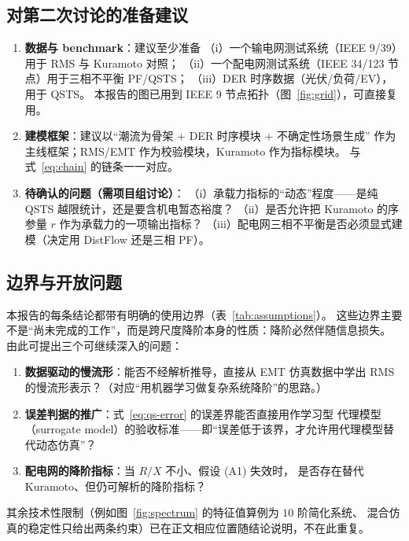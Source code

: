 \subsection{对第二次讨论的准备建议}

\begin{enumerate}[leftmargin=1.6em]
\item \textbf{数据与 benchmark}：建议至少准备
（i）一个输电网测试系统（IEEE 9/39）用于 RMS 与 Kuramoto 对照；
（ii）一个配电网测试系统（IEEE 34/123 节点）用于三相不平衡 PF/QSTS；
（iii）DER 时序数据（光伏/负荷/EV），用于 QSTS。
本报告的图已用到 IEEE 9 节点拓扑（图~\ref{fig:grid}），可直接复用。
\item \textbf{建模框架}：建议以“潮流为骨架 $+$ DER 时序模块 $+$ 不确定性场景生成”
作为主线框架；RMS/EMT 作为校验模块，Kuramoto 作为指标模块。
与式~\eqref{eq:chain} 的链条一一对应。
\item \textbf{待确认的问题（需项目组讨论）}：
（i）承载力指标的“动态”程度——是纯 QSTS 越限统计，还是要含机电暂态裕度？
（ii）是否允许把 Kuramoto 的序参量 $r$ 作为承载力的一项输出指标？
（iii）配电网三相不平衡是否必须显式建模（决定用 DistFlow 还是三相 PF）。
\end{enumerate}

\subsection{边界与开放问题}

本报告的每条结论都带有明确的使用边界（表~\ref{tab:assumptions}）。
这些边界主要不是“尚未完成的工作”，而是跨尺度降阶本身的性质：降阶必然伴随信息损失。
由此可提出三个可继续深入的问题：

\begin{enumerate}[leftmargin=1.6em]
\item \textbf{数据驱动的慢流形}：能否不经解析推导，直接从 EMT 仿真数据中学出
RMS 的慢流形表示？（对应“用机器学习做复杂系统降阶”的思路。）
\item \textbf{误差判据的推广}：式~\eqref{eq:qs-error} 的误差界能否直接用作学习型
代理模型（surrogate model）的验收标准——即“误差低于该界，才允许用代理模型替代动态仿真”？
\item \textbf{配电网的降阶指标}：当 $R/X$ 不小、假设 (A1) 失效时，
是否存在替代 Kuramoto、但仍可解析的降阶指标？
\end{enumerate}

其余技术性限制（例如图~\ref{fig:spectrum} 的特征值算例为 $10$ 阶简化系统、
混合仿真的稳定性只给出两条约束）已在正文相应位置随结论说明，不在此重复。
